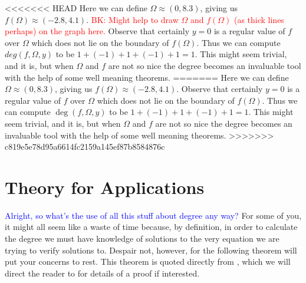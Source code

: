 \documentclass[11pt]{article}
\theoremstyle{plain}
\theoremstyle{definition}
\theoremstyle{remark}
\newcommand{\add}[1]{\textcolor{blue}{#1}}
\newcommand{\delete}[1]{\textcolor{red}{#1}}
\newcommand{\modified}[1]{\textcolor{darkgrn}{#1}}
\begin{document}
<<<<<<< HEAD
Here we can define $\Omega\approx (0,8.3)$, giving us $f(\Omega)\approx (-2.8,4.1)$. \delete{BK: Might help to draw $\Omega$ and $f(\Omega)$ (as thick lines perhaps) on the graph here.}
Observe that certainly $y=0$ is a regular value of $f$ over $\Omega$ which does not lie on the boundary of $f(\Omega)$.
Thus we can compute $deg\left(f,\Omega,y\right)$ to be $1+(-1)+1+(-1)+1=1$.
This might seem trivial, and it is, but when $\Omega$ and $f$ are not so nice the degree becomes an invaluable tool with the help of some well meaning theorems. 
=======
Here we can define $\Omega\approx (0,8.3)$, giving us $f(\Omega)\approx (-2.8,4.1)$. Observe that certainly $y=0$ is a regular value of $f$ over $\Omega$ which does not lie on the boundary of $f(\Omega)$. Thus we can compute $\operatorname{deg}\left(f,\Omega,y\right)$ to be $1+(-1)+1+(-1)+1=1$. This might seem trivial, and it is, but when $\Omega$ and $f$ are not so nice the degree becomes an invaluable tool with the help of some well meaning theorems. 
>>>>>>> c819e5e78d95a6614fc2159a145ef87b8584876c

\newpage

\section{Theory for Applications}

\add{Alright, so what's the use of all this stuff about degree any way?} For some of you, it might all seem like a waste of time because, by definition, in order to calculate the degree we must have knowledge of solutions to the very equation we are trying to verify solutions to. \modified{Despair not, however,} for the following theorem will put your concerns to rest. 
This theorem is quoted directly from \cite{OrChCh2006}, which we will direct the reader to for details of a proof if interested. 
\end{document}
